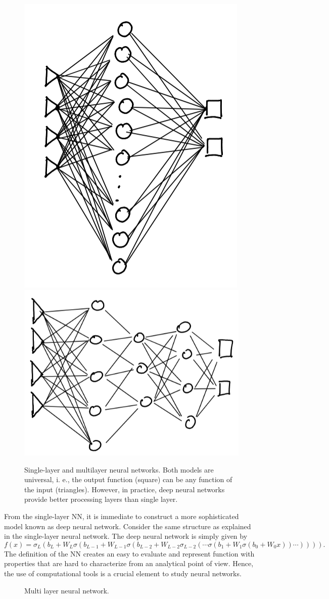 \documentclass[]{report}
\begin{document}
\begin{figure}
\centering
\includegraphics[height = .475\linewidth]{images/single layer nn}
\includegraphics[height = .475\linewidth]{images/multilayer nn}
\caption{Single-layer and multilayer neural networks. Both models are universal, i. e., the output function (square) can be any function of the input (triangles). However, in practice, deep neural networks provide better processing layers than single layer. }
\label{fig.neural-network}
\end{figure}

From the single-layer NN, it is immediate to construct a more sophisticated model known as deep neural network. Consider the same structure as explained in the single-layer neural network. The deep neural network is simply given by
\begin{equation}
f(x) = \sigma_L(b_L + W_L \sigma(b_{L-1} + W_{L - 1} \sigma(b_{L-2} + W_{L - 2} \sigma_{L - 2}(\cdots\sigma(b_1 + W_1 \sigma(b_0 + W_0 x)) \cdots)))).
\end{equation}
The definition of the NN creates an easy to evaluate and represent function with properties that are hard to characterize from an analytical point of view. Hence, the use of computational tools is a crucial element to study neural networks. 

\begin{figure}

\caption{Multi layer neural network.}
\label{fig.multi-layer-neural-network}
\end{figure}
\end{document}
